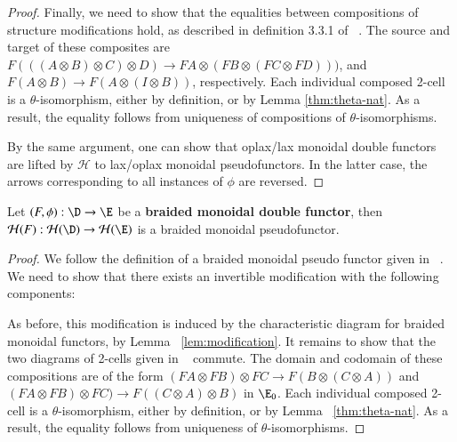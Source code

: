 \documentclass{amsart}
\begin{document}
\begin{proof}
Finally, we need to show that the equalities between compositions of structure modifications hold, as described in definition 3.3.1 of ~\cite{nick:tricats}. The source and target of these composites are $F(((A \otimes B) \otimes C) \otimes D) \rightarrow FA \otimes ( FB \otimes (FC \otimes FD)))$, and $F(A \otimes B) \rightarrow F(A \otimes (I \otimes B))$, respectively.  Each individual composed 2-cell is a $\theta$-isomorphism, either by definition, or by Lemma \ref{thm:theta-nat}. As a result, the equality follows from uniqueness of compositions of $\theta$-isomorphisms.

By the same argument, one can show that oplax/lax monoidal double functors are lifted by $\mathcal{H}$ to lax/oplax monoidal pseudofunctors. In the latter case, the arrows corresponding to all instances of $\phi$ are reversed. 
\end{proof}


\begin{lem}\label{lem:brfun}
Let $(F, \phi) :\D \rightarrow \E$ be a {\bf braided monoidal double functor}, then $\cH(F):\cH(\D) \rightarrow \cH(\E)$ is a braided monoidal pseudofunctor. 
\end{lem}

\begin{proof}
We follow the definition of a braided monoidal pseudo functor given in ~\cite{mccrudden:bal-coalgb}.
We need to show that there exists an invertible modification with the following components:

 
As before, this modification is induced by the characteristic diagram for braided monoidal functors, by Lemma ~\ref{lem:modification}.
It remains to show that the two diagrams of 2-cells given  in ~\cite{mccrudden:bal-coalgb} commute. The domain and codomain of these compositions are of the form $(FA \otimes FB) \otimes FC  \rightarrow F(B \otimes (C \otimes A))$  and $(FA \otimes FB) \otimes FC) \rightarrow F((C \otimes A) \otimes B)$ in $\E_0$.
Each individual composed 2-cell is a $\theta$-isomorphism, either by definition, or by Lemma ~\ref{thm:theta-nat}. As a result, the equality follows from uniqueness of $\theta$-isomorphisms. 
\end{proof}
\end{document}
